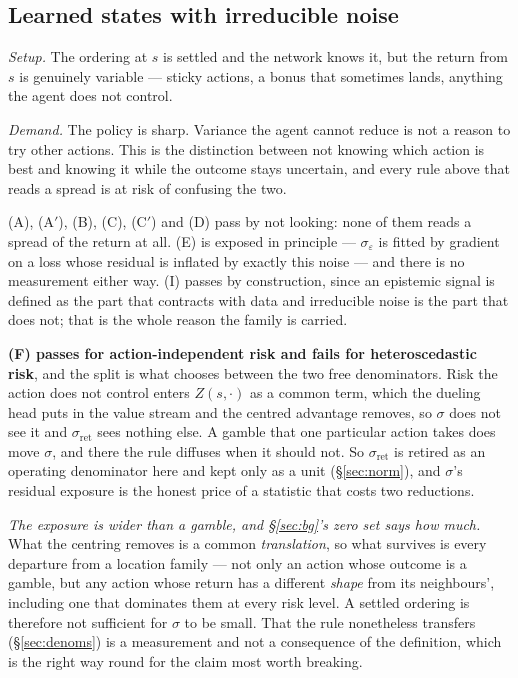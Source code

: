 \documentclass{article}
\newcommand{\sret}{\sigma_{\mathrm{ret}}}
\newcommand{\srank}{\sigma}
\newcommand{\snoise}{\sigma_{\varepsilon}}
\begin{document}
\subsection{Learned states with irreducible noise}
\label{sec:c10}

\emph{Setup.} The ordering at $s$ is settled and the network knows it, but the return from $s$
is genuinely variable --- sticky actions, a bonus that sometimes lands, anything the agent does
not control.

\emph{Demand.} The policy is sharp. Variance the agent cannot reduce is not a reason to try
other actions. This is the distinction between not knowing which action is best and knowing it
while the outcome stays uncertain, and every rule above that reads a spread is at risk of
confusing the two.

(A), (A$'$), (B), (C), (C$'$) and (D) pass by not looking: none of them reads a spread of the
return at all. (E) is exposed in principle --- $\snoise$ is fitted by gradient on a loss whose
residual is inflated by exactly this noise --- and there is no measurement either way. (I) passes
by construction, since an epistemic signal is defined as the part that contracts with data and
irreducible noise is the part that does not; that is the whole reason the family is carried.

\textbf{(F) passes for action-independent risk and fails for heteroscedastic risk}, and the
split is what chooses between the two free denominators. Risk the action does not control enters
$Z(s,\cdot)$ as a common term, which the dueling head puts in the value stream and the centred
advantage removes, so $\srank$ does not see it and $\sret$ sees nothing else. A gamble that one
particular action takes does move $\srank$, and there the rule diffuses when it should not. So
$\sret$ is retired as an operating denominator here and kept only as a unit (\S\ref{sec:norm}),
and $\srank$'s residual exposure is the honest price of a statistic that costs two reductions.

\emph{The exposure is wider than a gamble, and \S\ref{sec:bg}'s zero set says how much.} What
the centring removes is a common \emph{translation}, so what survives is every departure from a
location family --- not only an action whose outcome is a gamble, but any action whose return
has a different \emph{shape} from its neighbours', including one that dominates them at every
risk level. A settled ordering is therefore not sufficient for $\srank$ to be small. That the
rule nonetheless transfers (\S\ref{sec:denoms}) is a measurement and not a consequence of the
definition, which is the right way round for the claim most worth breaking.
\end{document}
